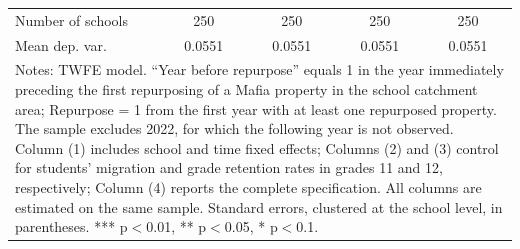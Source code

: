 \documentclass[12pt]{article}
\theoremstyle{plain}
\theoremstyle{plain}
\theoremstyle{plain}
\theoremstyle{definition}
\theoremstyle{plain}
\theoremstyle{definition}
\theoremstyle{plain}
\theoremstyle{remark}
\theoremstyle{definition}
\theoremstyle{definition}
\theoremstyle{plain}
\begin{document}
\begin{table}[H]
{\begin{tabular}{p{12.39em}llll}
			\multicolumn{1}{l}{Number of schools} & \multicolumn{1}{c}{250} & \multicolumn{1}{c}{250} & \multicolumn{1}{c}{250} & \multicolumn{1}{c}{250} \\
			\multicolumn{1}{l}{Mean dep. var.} & \multicolumn{1}{c}{0.0551} & \multicolumn{1}{c}{0.0551} & \multicolumn{1}{c}{0.0551} & \multicolumn{1}{c}{0.0551} \\
			\midrule
			\multicolumn{5}{p{36.39em}}{Notes: TWFE model. ``Year before repurpose'' equals 1 in the year immediately preceding the first repurposing of a Mafia property in the school catchment area; Repurpose = 1 from the first year with at least one repurposed property. The sample excludes 2022, for which the following year is not observed. Column (1) includes school and time fixed effects; Columns (2) and (3) control for students' migration and grade retention rates in grades 11 and 12, respectively; Column (4) reports the complete specification. All columns are estimated on the same sample. Standard errors, clustered at the school level, in parentheses. *** p$<$0.01, ** p$<$0.05, * p$<$0.1.} \\
		\end{tabular}%
	}
\end{table}




\FloatBarrier
\end{document}
